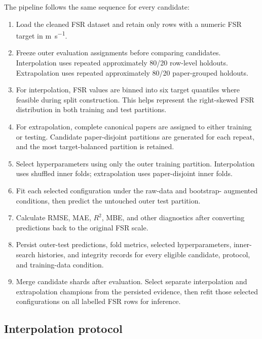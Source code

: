 The pipeline follows the same sequence for every candidate:

\begin{enumerate}
  \item Load the cleaned FSR dataset and retain only rows with a numeric FSR
  target in \si{\metre\per\second}.

  \item Freeze outer evaluation assignments before comparing candidates.
  Interpolation uses repeated approximately 80/20 row-level holdouts.
  Extrapolation uses repeated approximately 80/20 paper-grouped holdouts.

  \item For interpolation, FSR values are binned into six target quantiles
  where feasible during split construction. This helps represent the
  right-skewed FSR distribution in both training and test partitions.

  \item For extrapolation, complete canonical papers are assigned to either
  training or testing. Candidate paper-disjoint partitions are generated for
  each repeat, and the most target-balanced partition is retained.

  \item Select hyperparameters using only the outer training partition.
  Interpolation uses shuffled inner folds; extrapolation uses paper-disjoint
  inner folds.

  \item Fit each selected configuration under the raw-data and bootstrap-
  augmented conditions, then predict the untouched outer test partition.

  \item Calculate RMSE, MAE, \(R^2\), MBE, and other diagnostics after
  converting predictions back to the original FSR scale.

  \item Persist outer-test predictions, fold metrics, selected
  hyperparameters, inner-search histories, and integrity records for every
  eligible candidate, protocol, and training-data condition.

  \item Merge candidate shards after evaluation. Select separate interpolation
  and extrapolation champions from the persisted evidence, then refit those
  selected configurations on all labelled FSR rows for inference.
\end{enumerate}

\subsection{Interpolation protocol}

